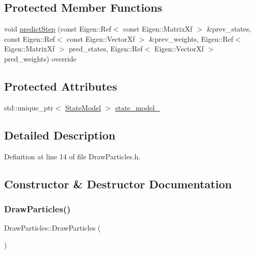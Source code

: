 \subsection*{Protected Member Functions}
\begin{DoxyCompactItemize}
\item 
void \mbox{\hyperlink{classbfl_1_1DrawParticles_a7a50d50c32b155fc22bc2edafe991dcd}{predict\+Step}} (const Eigen\+::\+Ref$<$ const Eigen\+::\+Matrix\+Xf $>$ \&prev\+\_\+states, const Eigen\+::\+Ref$<$ const Eigen\+::\+Vector\+Xf $>$ \&prev\+\_\+weights, Eigen\+::\+Ref$<$ Eigen\+::\+Matrix\+Xf $>$ pred\+\_\+states, Eigen\+::\+Ref$<$ Eigen\+::\+Vector\+Xf $>$ pred\+\_\+weights) override
\end{DoxyCompactItemize}
\subsection*{Protected Attributes}
\begin{DoxyCompactItemize}
\item 
std\+::unique\+\_\+ptr$<$ \mbox{\hyperlink{classbfl_1_1StateModel}{State\+Model}} $>$ \mbox{\hyperlink{classbfl_1_1DrawParticles_a4acbc6e750895a3a27e68d0a9656b8cf}{state\+\_\+model\+\_\+}}
\end{DoxyCompactItemize}


\subsection{Detailed Description}


Definition at line 14 of file Draw\+Particles.\+h.



\subsection{Constructor \& Destructor Documentation}
\mbox{\label{classbfl_1_1DrawParticles_acd7269927dc19bf3f34f7a65934c1e2c}} 
\subsubsection{\texorpdfstring{Draw\+Particles()}{DrawParticles()}\hspace{0.1cm}{\footnotesize\ttfamily [1/2]}}
{\footnotesize\ttfamily Draw\+Particles\+::\+Draw\+Particles (\begin{DoxyParamCaption}{ }\end{DoxyParamCaption})\hspace{0.3cm}{\ttfamily [noexcept]}}




